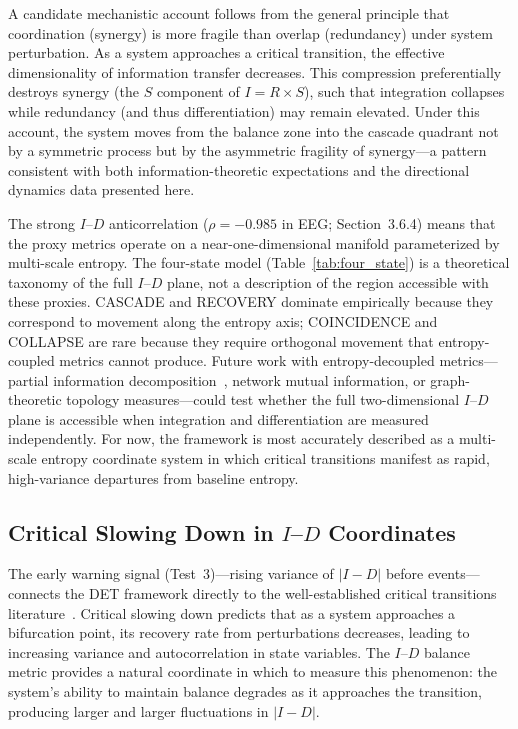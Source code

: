 \documentclass[12pt,a4paper]{article}
\begin{document}
A candidate mechanistic account follows from the general principle that coordination (synergy) is more fragile than overlap (redundancy) under system perturbation. As a system approaches a critical transition, the effective dimensionality of information transfer decreases. This compression preferentially destroys synergy (the $S$ component of $I = R \times S$), such that integration collapses while redundancy (and thus differentiation) may remain elevated. Under this account, the system moves from the balance zone into the cascade quadrant not by a symmetric process but by the asymmetric fragility of synergy---a pattern consistent with both information-theoretic expectations and the directional dynamics data presented here.

The strong $I$--$D$ anticorrelation ($\rho = -0.985$ in EEG; Section~3.6.4) means that the proxy metrics operate on a near-one-dimensional manifold parameterized by multi-scale entropy. The four-state model (Table~\ref{tab:four_state}) is a theoretical taxonomy of the full $I$--$D$ plane, not a description of the region accessible with these proxies. CASCADE and RECOVERY dominate empirically because they correspond to movement along the entropy axis; COINCIDENCE and COLLAPSE are rare because they require orthogonal movement that entropy-coupled metrics cannot produce. Future work with entropy-decoupled metrics---partial information decomposition~\cite{williams2010}, network mutual information, or graph-theoretic topology measures---could test whether the full two-dimensional $I$--$D$ plane is accessible when integration and differentiation are measured independently. For now, the framework is most accurately described as a multi-scale entropy coordinate system in which critical transitions manifest as rapid, high-variance departures from baseline entropy.

\subsection{Critical Slowing Down in $I$--$D$ Coordinates}

The early warning signal (Test~3)---rising variance of $|I - D|$ before events---connects the DET framework directly to the well-established critical transitions literature~\cite{scheffer2009,dakos2012}. Critical slowing down predicts that as a system approaches a bifurcation point, its recovery rate from perturbations decreases, leading to increasing variance and autocorrelation in state variables. The $I$--$D$ balance metric provides a natural coordinate in which to measure this phenomenon: the system's ability to maintain balance degrades as it approaches the transition, producing larger and larger fluctuations in $|I - D|$.
\end{document}
